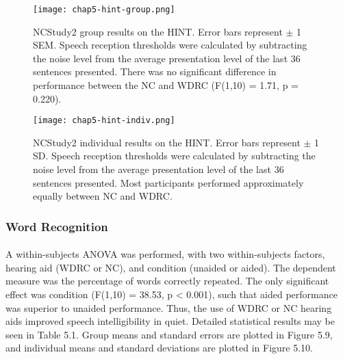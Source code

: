 
\begin{figure}[htp]
\begin{center}
\texttt{[image: chap5-hint-group.png]} \\
\caption[NCStudy2 group results on the HINT]{NCStudy2 group results on the HINT.  Error bars represent $\pm$ 1 SEM.  Speech reception thresholds were calculated by subtracting the noise level from the average presentation level of the last 36 sentences presented.  There was no significant difference in performance between the NC and WDRC (F(1,10) = 1.71, p = 0.220).}
\label{ch5-hint-group}
\end{center}
\end{figure}

\begin{figure}[htp]
\begin{center}
\texttt{[image: chap5-hint-indiv.png]} \\
\caption[NCStudy2 individual results on the HINT]{NCStudy2 individual results on the HINT.  Error bars represent $\pm$ 1 SD.  Speech reception thresholds were calculated by subtracting the noise level from the average presentation level of the last 36 sentences presented.  Most participants performed approximately equally between NC and WDRC.}
\label{ch5-hint-indiv}
\end{center}
\end{figure}

\subsubsection{Word Recognition}
\paragraph{}A within-subjects ANOVA was performed, with two within-subjects factors, hearing aid (WDRC or NC), and condition (unaided or aided).  The dependent measure was the percentage of words correctly repeated.  The only significant effect was condition (F(1,10) = 38.53, p < 0.001), such that aided performance was superior to unaided performance.  Thus, the use of WDRC or NC hearing aids improved speech intelligibility in quiet.  Detailed statistical results may be seen in Table 5.1.  Group means and standard errors are plotted in Figure 5.9, and individual means and standard deviations are plotted in Figure 5.10.

